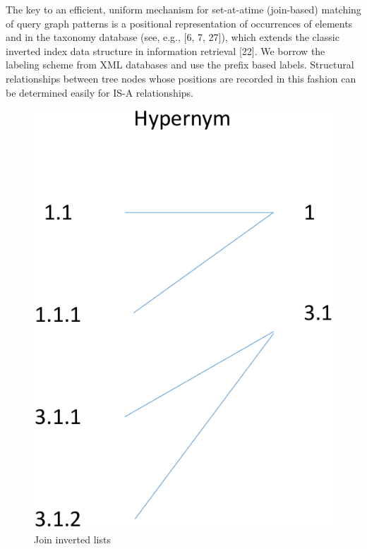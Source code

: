 The key to an efficient, uniform mechanism for set-at-atime
(join-based) matching of query graph patterns is a positional
representation of occurrences of  elements and in the taxonomy database (see, e.g., [6, 7, 27]),
which extends the classic inverted index data structure in information retrieval [22]. We borrow the labeling scheme from XML databases and use the prefix based labels. Structural relationships between tree nodes whose positions
are recorded in this fashion can be determined easily for IS-A relationships.


\begin{figure}[t]
\centering
\includegraphics[scale=0.4]{figures/labeljoins}
 \caption{Join inverted lists}
\label{fig:invertedlist}
\end{figure}


